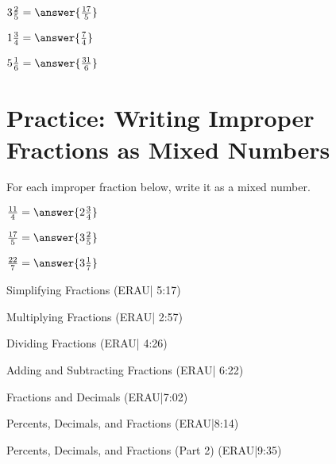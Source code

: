 \documentclass{ximera}
\begin{document}
\begin{problem}
$3\frac{2}{5} = \answer{\frac{17}{5}}$
\end{problem}

\begin{problem}
$1\frac{3}{4} = \answer{\frac{7}{4}}$
\end{problem}

\begin{problem}
$5\frac{1}{6} = \answer{\frac{31}{6}}$
\end{problem}



\section*{Practice: Writing Improper Fractions as Mixed Numbers}

For each improper fraction below, write it as a mixed number.

\begin{problem}
$\frac{11}{4} = \answer{2\frac{3}{4}}$
\end{problem}

\begin{problem}
$\frac{17}{5} = \answer{3\frac{2}{5}}$
\end{problem}

\begin{problem}
$\frac{22}{7} = \answer{3\frac{1}{7}}$
\end{problem}


Simplifying Fractions (ERAU| 5:17)


Multiplying Fractions (ERAU| 2:57)


Dividing Fractions (ERAU| 4:26)


Adding and Subtracting Fractions (ERAU| 6:22)


Fractions and Decimals (ERAU|7:02)


Percents, Decimals, and Fractions (ERAU|8:14)


Percents, Decimals, and Fractions (Part 2) (ERAU|9:35)

\end{document}

